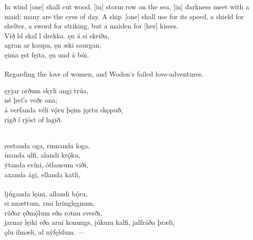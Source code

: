 \bvb In wind [one] shall cut wood, [in] storm row on the sea, [in] darkness meet with a maid; many are the eyes of day. A ship [one] shall use for its speed, a shield for shelter, a sword for striking, but a maiden for [her] kisses. \\

\bva Við ld skal l drekka. \hld ęn á si skríða, \\%
agran ar kaupa, \hld ęn æki saurgan, \\%
ęima ęst fęita, \hld ęn und á búi. \\%

 \\

	Regarding the love of women, and Woden's failed love-adventures.

\bva {}ęyjar orðum \hld skyli angi trúa, \\%
\ind né því's veðr ona; \\%
á verfanda véli \hld vǫ́ru þęim jǫrtu skǫpuð, \\%
\ind {}rigð í rjóst of lagið\footnotemark[29]. \\%

 \\

\bva {}restanda oga, \hld {}rinnanda loga, \\%
ínanda ulfi, \hld {}alandi krǫ́ku, \\%
ýtanda svíni, \hld {}ótlausum viði, \\%
axanda ági, \hld {}ellanda katli,\\%

 \\

\bva {}ljúganda lęini, \hld {}allandi bǫ́ru, \\%
si nnættum, \hld {}rmi hringlęgnum, \\%
rúðar ęðmǫ́lum \hld eða rotnu sverði, \\%
jarnar lęiki \hld eða arni konungs,
júkum kalfi, \hld {}jalfráða þræli, \\%
ǫlu ilmæli, \hld {}al nýfęldum. —\\%

